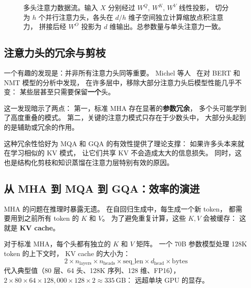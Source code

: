 \begin{figure}[htbp]
\caption{多头注意力数据流。输入 $X$ 分别经过 $W^Q$, $W^K$, $W^V$ 线性投影，
切分为 $h$ 个并行注意力头，各头在 $d/h$ 维子空间独立计算缩放点积注意力，
拼接后经 $W^O$ 投影为 $d$ 维输出。总参数量与单头注意力一致。}
\label{fig:mha-architecture}
\end{figure}

\subsection{注意力头的冗余与剪枝}

一个有趣的发现是：并非所有注意力头同等重要。
Michel 等人~\cite{michel2019heads}
在对 BERT 和 NMT 模型的分析中发现，
在许多层中，移除大部分注意力头后模型性能几乎不变：
某些层甚至只需要保留\textbf{一个}头。

这一发现暗示了两点：
第一，标准 MHA 存在显著的\textbf{参数冗余}，
多个头可能学到了高度重叠的模式。
第二，关键的注意力模式只存在于少数头中，
大部分头起到的是辅助或冗余的作用。

这种冗余性恰好为 MQA 和 GQA 的有效性提供了理论支撑：
如果许多头本来就在学习相似的 KV 模式，
让它们共享 KV 不会造成太大的信息损失。
同时，这也是结构化剪枝和知识蒸馏在注意力层特别有效的原因。

\subsection{从 MHA 到 MQA 到 GQA：效率的演进}

MHA 的问题在推理时暴露无遗。
在自回归生成中，每生成一个新 token，
都需要用到之前所有 token 的 $K$ 和 $V$。
为了避免重复计算，这些 $K, V$ 会被缓存：
这就是 \textbf{KV cache}。

对于标准 MHA，每个头都有独立的 $K$ 和 $V$ 矩阵。
一个 70B 参数模型处理 128K token 的上下文时，
KV cache 的大小为：
\[
  2 \times n_{\mathrm{layers}} \times n_{\mathrm{heads}}
  \times \mathrm{seq\_len} \times d_{\mathrm{head}} \times \mathrm{bytes}
\]
代入典型值（80 层、64 头、128K 序列、128 维、FP16），
$2 \times 80 \times 64 \times 128{,}000 \times 128 \times 2 \approx 335$\,GB：
远超单块 GPU 的显存。

